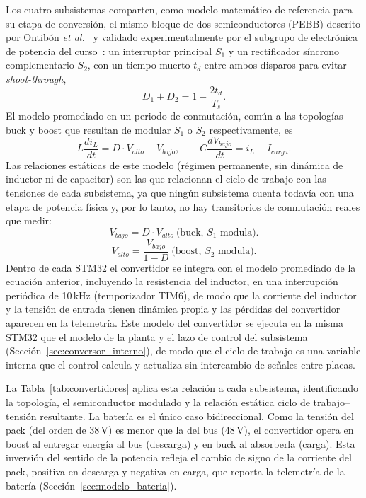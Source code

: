 \documentclass[conference]{IEEEtran}
\begin{document}
Los cuatro subsistemas comparten, como modelo matemático de referencia para su etapa de conversión, el mismo bloque de dos semiconductores (PEBB) descrito por Ontibón \emph{et al.}~\cite{ontibon2025pebb} y validado experimentalmente por el subgrupo de electrónica de potencia del curso~\cite{pinto2026peb}: un interruptor principal $S_1$ y un rectificador síncrono complementario $S_2$, con un tiempo muerto $t_d$ entre ambos disparos para evitar \emph{shoot-through},
\begin{equation}
D_1 + D_2 = 1 - \frac{2t_d}{T_s}.
\end{equation}
El modelo promediado en un periodo de conmutación, común a las topologías buck y boost que resultan de modular $S_1$ o $S_2$ respectivamente, es
\begin{equation}
L\frac{di_L}{dt} = D\cdot V_{alto} - V_{bajo}, \qquad C\frac{dV_{bajo}}{dt} = i_L - I_{carga}.
\end{equation}
Las relaciones estáticas de este modelo (régimen permanente, sin dinámica de inductor ni de capacitor) son las que relacionan el ciclo de trabajo con las tensiones de cada subsistema, ya que ningún subsistema cuenta todavía con una etapa de potencia física y, por lo tanto, no hay transitorios de conmutación reales que medir:
\begin{equation}
V_{bajo} = D\cdot V_{alto} \ \text{(buck, } S_1 \text{ modula)}.
\end{equation}
\begin{equation}
V_{alto} = \frac{V_{bajo}}{1-D} \ \text{(boost, } S_2 \text{ modula)}.
\end{equation}
Dentro de cada STM32 el convertidor se integra con el modelo promediado de la ecuación anterior, incluyendo la resistencia del inductor, en una interrupción periódica de 10\,kHz (temporizador TIM6), de modo que la corriente del inductor y la tensión de entrada tienen dinámica propia y las pérdidas del convertidor aparecen en la telemetría.
Este modelo del convertidor se ejecuta en la misma STM32 que el modelo de la planta y el lazo de control del subsistema (Sección~\ref{sec:conversor_interno}), de modo que el ciclo de trabajo es una variable interna que el control calcula y actualiza sin intercambio de señales entre placas.

La Tabla~\ref{tab:convertidores} aplica esta relación a cada subsistema, identificando la topología, el semiconductor modulado y la relación estática ciclo de trabajo--tensión resultante. La batería es el único caso bidireccional. Como la tensión del pack (del orden de 38\,V) es menor que la del bus (48\,V), el convertidor opera en boost al entregar energía al bus (descarga) y en buck al absorberla (carga). Esta inversión del sentido de la potencia refleja el cambio de signo de la corriente del pack, positiva en descarga y negativa en carga, que reporta la telemetría de la batería (Sección~\ref{sec:modelo_bateria}).
\end{document}
